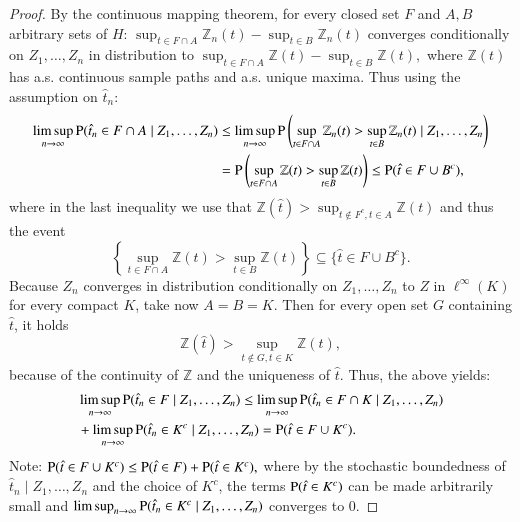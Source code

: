 	\begin{proof}
		By the continuous mapping theorem, for every closed set \( F \) and \( A, B \) arbitrary sets of \(H\): $\sup_{t \in F \cap A} \mathbb{Z}_n(t) - \sup_{t \in B} \mathbb{Z}_n(t)$ converges conditionally on \(Z_1, \ldots, Z_n\) in distribution to $\sup_{t \in F \cap A} \mathbb{Z}(t) - \sup_{t \in B} \mathbb{Z}(t),$ where \( \mathbb{Z}(t)\) has a.s. continuous sample paths and a.s. unique maxima.
		Thus using the assumption on $\hat{t}_n$:
		\begin{align*}
		\limsup_{n \to \infty} \mathrm{P}(\hat{t}_n \in F \cap A \mid Z_1, \ldots, Z_n)
		&\leq \limsup_{n \to \infty} \mathrm{P}\left( \sup_{t \in F \cap A} \mathbb{Z}_n(t) > \sup_{t \in B} \mathbb{Z}_n(t) \mid Z_1, \ldots, Z_n \right) \\
		&= \mathrm{P}\left( \sup_{t \in F \cap A} \mathbb{Z}(t) > \sup_{t \in B} \mathbb{Z}(t) \right)
		\leq \mathrm{P}(\hat{t} \in F \cup B^c),
		\end{align*}
		where in the last inequality we use that \( \mathbb{Z}(\hat{t}) > \sup_{t \notin F^c, t \in A} \mathbb{Z}(t)\) and thus the event 
		\[
		\left\{\sup_{t \in F \cap A} \mathbb{Z}(t) > \sup_{t \in B} \mathbb{Z}(t)\right\} \subseteq \{ \hat{t} \in F \cup B^c\}.
		\]
		Because \(Z_n\) converges in distribution conditionally on \(Z_1, \ldots, Z_n\) to \(Z\) in \(\ell^\infty(K)\) for every compact \(K\), take now \(A = B = K\). Then for every open set \(G\) containing \(\hat{t}\), it holds
		\[
		\mathbb{Z}(\hat{t}) > \sup_{t \notin G, t \in K} \mathbb{Z}(t),
		\]
		because of the continuity of \(\mathbb{Z}\) and the uniqueness of \(\hat{t}\). Thus, the above yields:
		\begin{align*}
		&\limsup_{n \to \infty} \mathrm{P}(\hat{t}_n \in F \mid Z_1, \ldots, Z_n) 
		\leq \limsup_{n \to \infty} \mathrm{P}(\hat{t}_n \in F \cap K \mid Z_1, \ldots, Z_n) 
		 \\
		&+ \limsup_{n \to \infty} \mathrm{P}(\hat{t}_n \in K^c \mid Z_1, \ldots, Z_n) = \mathrm{P}(\hat{t} \in F \cup K^c).
		\end{align*}
		Note: $\mathrm{P}(\hat{t} \in F \cup K^c) \leq \mathrm{P}(\hat{t} \in F) + \mathrm{P}(\hat{t} \in K^c),$
		where by the stochastic boundedness of \(\hat{t}_n \mid Z_1, \ldots, Z_n\) and the choice of \(K^c\), the terms \(\mathrm{P}(\hat{t} \in K^c)\) can be made arbitrarily small and $\limsup_{n \to \infty} \mathrm{P}(\hat{t}_n \in K^c \mid Z_1, \ldots, Z_n)$ converges to $0$.		
	\end{proof}

